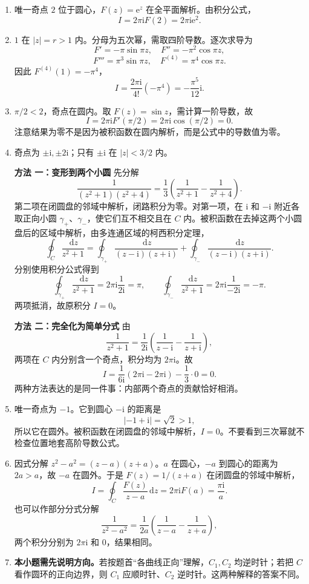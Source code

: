 \documentclass[UTF8,11pt,a4paper,fontset=fandol]{ctexart}
\newcommand{\ii}{\mathrm{i}}
\newcommand{\ee}{\mathrm{e}}
\newcommand{\dd}{\,\mathrm{d}}
\newcommand{\method}[1]{\par\medskip\Needspace{3\baselineskip}\noindent\textbf{方法 #1}\quad}
\begin{document}
\begin{enumerate}
\item 唯一奇点 $2$ 位于圆心，$F(z)=\ee^z$ 在全平面解析。由积分公式，
\[
I=2\pi\ii F(2)=2\pi\ii\ee^2.
\]
\item $1$ 在 $|z|=r>1$ 内。分母为五次幂，需取四阶导数。逐次求导为
\[
F'=-\pi\sin\pi z,\quad F''=-\pi^2\cos\pi z,
\]
\[
F'''=\pi^3\sin\pi z,\quad F^{(4)}=\pi^4\cos\pi z.
\]
因此 $F^{(4)}(1)=-\pi^4$，
\[
I=\frac{2\pi\ii}{4!}(-\pi^4)=-\frac{\pi^5}{12}\ii.
\]
\item $\pi/2<2$，奇点在圆内。取 $F(z)=\sin z$，需计算一阶导数，故
\[
I=2\pi\ii F'(\pi/2)=2\pi\ii\cos(\pi/2)=0.
\]
注意结果为零不是因为被积函数在圆内解析，而是公式中的导数值为零。
\item 奇点为 $\pm\ii,\pm2\ii$；只有 $\pm\ii$ 在 $|z|<3/2$ 内。
\method{一：变形到两个小圆}
先分解
\[
\frac1{(z^2+1)(z^2+4)}
=\frac13\left(\frac1{z^2+1}-\frac1{z^2+4}\right).
\]
第二项在闭圆盘的邻域中解析，闭路积分为零。对第一项，在 $\ii$ 和 $-\ii$ 附近各取正向小圆 $\gamma_+$、$\gamma_-$，使它们互不相交且在 $C$ 内。被积函数在去掉这两个小圆盘后的区域中解析，由多连通区域的柯西积分定理，
\[
\oint_C\frac{\dd z}{z^2+1}
=\oint_{\gamma_+}\frac{\dd z}{(z-\ii)(z+\ii)}
+\oint_{\gamma_-}\frac{\dd z}{(z-\ii)(z+\ii)}.
\]
分别使用积分公式得到
\[
\oint_{\gamma_+}\frac{\dd z}{z^2+1}
=2\pi\ii\frac1{2\ii}=\pi,
\qquad
\oint_{\gamma_-}\frac{\dd z}{z^2+1}
=2\pi\ii\frac1{-2\ii}=-\pi.
\]
两项抵消，故原积分 $I=0$。
\method{二：完全化为简单分式}
由
\[
\frac1{z^2+1}=\frac1{2\ii}\left(\frac1{z-\ii}-\frac1{z+\ii}\right),
\]
两项在 $C$ 内分别含一个奇点，积分均为 $2\pi\ii$。故
\[
I=\frac1{6\ii}(2\pi\ii-2\pi\ii)-\frac13\cdot0=0.
\]
两种方法表达的是同一件事：内部两个奇点的贡献恰好相消。
\item 唯一奇点为 $-1$。它到圆心 $-\ii$ 的距离是
\[
|-1+\ii|=\sqrt2>1,
\]
所以它在圆外。被积函数在闭圆盘的邻域中解析，$I=0$。不要看到三次幂就不检查位置地套高阶导数公式。
\item 因式分解 $z^2-a^2=(z-a)(z+a)$。$a$ 在圆心，$-a$ 到圆心的距离为 $2a>a$，故 $-a$ 在圆外。于是 $F(z)=1/(z+a)$ 在闭圆盘的邻域中解析，
\[
I=\oint_C\frac{F(z)}{z-a}\dd z
=2\pi\ii F(a)=\frac{\pi\ii}{a}.
\]
也可以作部分分式分解
\[
\frac1{z^2-a^2}=\frac1{2a}\left(\frac1{z-a}-\frac1{z+a}\right),
\]
两个积分分别为 $2\pi\ii$ 和 $0$，结果相同。
\item \textbf{本小题需先说明方向。}若按题首“各曲线正向”理解，$C_1,C_2$ 均逆时针；若把 $C$ 看作圆环的正向边界，则 $C_1$ 应顺时针、$C_2$ 逆时针。这两种解释的答案不同。


\end{enumerate}
\end{document}
